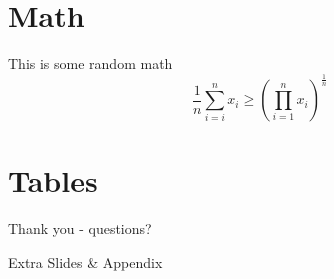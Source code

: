 \documentclass[9pt]{beamer}
\begin{document}
	\section[Math]{Math}
	\begin{frame}[Math]{This is some random math}
		\begin{equation}
			\frac{1}{n} \sum_{i=i}^{n} x_{i} \geq
			\left(\prod _{i=1}^{n}x_{i}\right)^{\frac {1}{n}}
		\end{equation}
	\end{frame}



	\section[Tables]{Tables}


	{ %
		\begin{frame}[standout]
			Thank you - questions? \\
		\end{frame}
	}



	\appendix

	{
		\begin{frame}[standout]{}
			Extra Slides \& Appendix
		\end{frame}
	}


\end{document}
